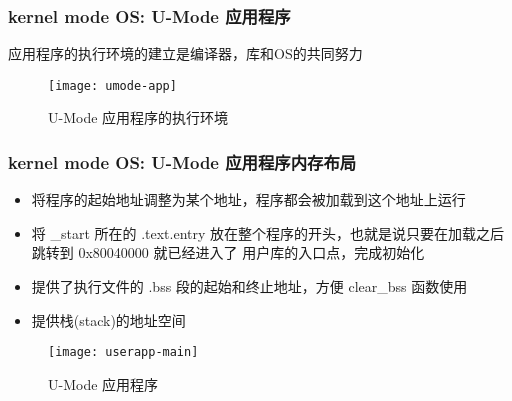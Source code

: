 \begin{frame}
	\frametitle{kernel mode OS: U-Mode 应用程序}
%		
%		

应用程序的执行环境的建立是编译器，库和OS的共同努力
	\begin{figure}
        \centering
        \texttt{[image: umode-app]}
        \caption{U-Mode 应用程序的执行环境}
    \end{figure}
\end{frame}

\begin{frame}
    \frametitle{kernel mode OS: U-Mode 应用程序内存布局}
    	\begin{itemize}
    		
    		\item 将程序的起始地址调整为某个地址，程序都会被加载到这个地址上运行
    		
    		\item 将 \_start 所在的 .text.entry 放在整个程序的开头，也就是说只要在加载之后跳转到 0x80040000 就已经进入了 用户库的入口点，完成初始化
            \item 提供了执行文件的 .bss 段的起始和终止地址，方便 clear\_bss 函数使用
            \item 提供栈(stack)的地址空间
    		
    	\end{itemize}	
    \begin{figure}
        \centering
        \texttt{[image: userapp-main]}
        \caption{U-Mode 应用程序}
    \end{figure}
\end{frame}


